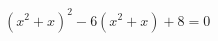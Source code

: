 \begin{ex}[type=equation]
	\begin{condition}
		$\left(x^2 + x\right)^2 - 6\left(x^2 + x\right) + 8 = 0$
	\end{condition}
\end{ex}